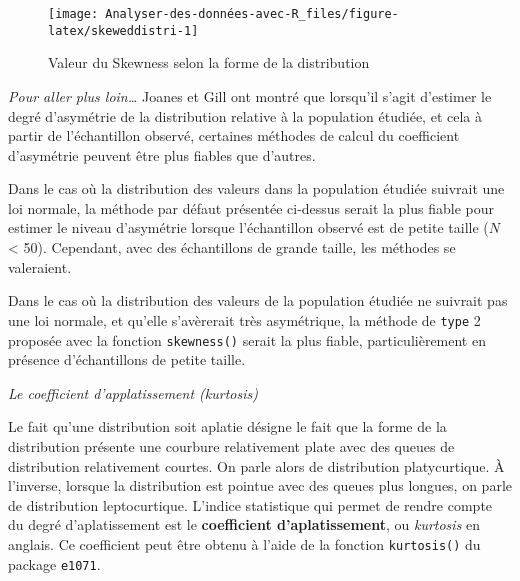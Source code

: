 \documentclass[
  french,
]{book}
\newenvironment{Shaded}{\begin{snugshade}}{\end{snugshade}}
\newcommand{\DataTypeTok}[1]{\textcolor[rgb]{0.13,0.29,0.53}{#1}}
\newcommand{\DecValTok}[1]{\textcolor[rgb]{0.00,0.00,0.81}{#1}}
\newcommand{\KeywordTok}[1]{\textcolor[rgb]{0.13,0.29,0.53}{\textbf{#1}}}
\newcommand{\NormalTok}[1]{#1}
\newcommand{\OperatorTok}[1]{\textcolor[rgb]{0.81,0.36,0.00}{\textbf{#1}}}
\begin{document}
\begin{figure}

{\centering \texttt{[image: Analyser-des-données-avec-R\_files/figure-latex/skeweddistri-1]} 

}

\caption{Valeur du Skewness selon la forme de la distribution}\label{fig:skeweddistri}
\end{figure}

\emph{Pour aller plus loin\ldots{}}
Joanes et Gill \autocite*{joanesComparingMeasuresSample1998} ont montré que lorsqu'il s'agit d'estimer le degré d'asymétrie de la distribution relative à la population étudiée, et cela à partir de l'échantillon observé, certaines méthodes de calcul du coefficient d'asymétrie peuvent être plus fiables que d'autres.

Dans le cas où la distribution des valeurs dans la population étudiée suivrait une loi normale, la méthode par défaut présentée ci-dessus serait la plus fiable pour estimer le niveau d'asymétrie lorsque l'échantillon observé est de petite taille (\(N\) \textless{} 50). Cependant, avec des échantillons de grande taille, les méthodes se valeraient.

Dans le cas où la distribution des valeurs de la population étudiée ne suivrait pas une loi normale, et qu'elle s'avèrerait très asymétrique, la méthode de \texttt{type} 2 proposée avec la fonction \texttt{skewness()} serait la plus fiable, particulièrement en présence d'échantillons de petite taille.

\emph{Le coefficient d'applatissement (kurtosis)}

Le fait qu'une distribution soit aplatie désigne le fait que la forme de la distribution présente une courbure relativement plate avec des queues de distribution relativement courtes. On parle alors de distribution platycurtique. À l'inverse, lorsque la distribution est pointue avec des queues plus longues, on parle de distribution leptocurtique. L'indice statistique qui permet de rendre compte du degré d'aplatissement est le \textbf{coefficient d'aplatissement}, ou \emph{kurtosis} en anglais. Ce coefficient peut être obtenu à l'aide de la fonction \texttt{kurtosis()} du package \texttt{e1071}.

\begin{Shaded}
\end{Shaded}
\end{document}
